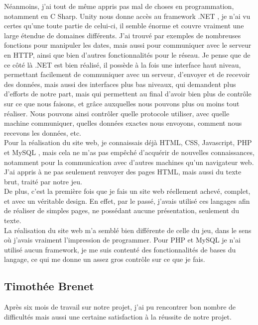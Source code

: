 \documentclass[12pt]{article}
\begin{document}
Néanmoins, j'ai tout de même appris pas mal de choses en programmation, notamment en C Sharp. Unity nous donne accès au framework .NET \cite{net}, je n'ai vu certes qu'une toute partie de celui-ci, il semble énorme et couvre vraiment une large étendue de domaines différents. J'ai trouvé par exemples de nombreuses fonctions pour manipuler les dates, mais aussi pour communiquer avec le serveur en \gls{HTTP}, ainsi que bien d'autres fonctionnalités pour le réseau. Je pense que de ce côté là .NET est bien réalisé, il possède à la fois une interface haut niveau, permettant facilement de communiquer avec un serveur, d'envoyer et de recevoir des données, mais aussi des interfaces plus bas niveaux, qui demandent plus d'efforts de notre part, mais qui permettent au final d'avoir bien plus de contrôle sur ce que nous faisons, et grâce auxquelles nous pouvons plus ou moins tout réaliser. Nous pouvons ainsi contrôler quelle protocole utiliser, avec quelle machine communiquer, quelles données exactes nous envoyons, comment nous recevons les données, etc.\\

Pour la réalisation du site web, je connaissais déjà \gls{HTML}, \gls{CSS}, \gls{Javascript}, \gls{PHP} et MySQL \cite{mysql}, mais cela ne m'as pas empêché d'acquérir de nouvelles connaissances, notamment pour la communication avec d'autres machines qu'un navigateur web. J'ai appris à ne pas seulement renvoyer des pages HTML, mais aussi du texte brut, traité par notre jeu.\\
De plus, c'est la première fois que je fais un site web réellement achevé, complet, et avec un véritable design. En effet, par le passé, j'avais utilisé ces langages afin de réaliser de simples pages, ne possédant aucune présentation, seulement du texte.\\
La réalisation du site web m'a semblé bien différente de celle du jeu, dans le sens où j'avais vraiment l'impression de programmer. Pour \gls{PHP} et MySQL \cite{mysql} je n'ai utilisé aucun framework, je me suis contenté des fonctionnalités de bases du langage, ce qui me donne un assez gros contrôle sur ce que je fais.

\subsection{Timothée Brenet}

Après six mois de travail sur notre projet, j'ai pu rencontrer bon nombre de difficultés mais aussi une certaine satisfaction à la réussite de notre projet.\\
\end{document}
